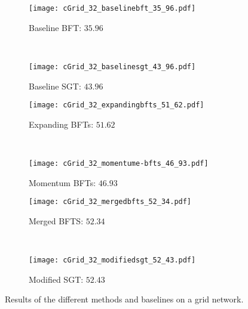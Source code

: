 \documentclass[a4paper,final,notitlepage,11pt,svgnames]{scrartcl}
\begin{document}
\begin{figure}[htpb]
	\centering
	\begin{subfigure}[b]{0.45\textwidth}
		\texttt{[image: cGrid\_32\_baselinebft\_35\_96.pdf]}
		\caption{Baseline BFT: $35.96$}
	\end{subfigure}~
	\begin{subfigure}[b]{0.45\textwidth}
		\texttt{[image: cGrid\_32\_baselinesgt\_43\_96.pdf]}
		\caption{Baseline SGT: $43.96$}
	\end{subfigure}

	\begin{subfigure}[b]{0.45\textwidth}
		\texttt{[image: cGrid\_32\_expandingbfts\_51\_62.pdf]}
		\caption{Expanding BFTs: $51.62$}
	\end{subfigure}~
	\begin{subfigure}[b]{0.45\textwidth}
		\texttt{[image: cGrid\_32\_momentume-bfts\_46\_93.pdf]}
		\caption{Momentum BFTs: $46.93$}
	\end{subfigure}

	\begin{subfigure}[b]{0.45\textwidth}
		\texttt{[image: cGrid\_32\_mergedbfts\_52\_34.pdf]}
		\caption{Merged BFTS: $52.34$}
	\end{subfigure}~
	\begin{subfigure}[b]{0.45\textwidth}
		\texttt{[image: cGrid\_32\_modifiedsgt\_52\_43.pdf]}
		\caption{Modified SGT: $52.43$}
	\end{subfigure}
	\caption{Results of the different methods and baselines on a grid network.
		\label{fig:rgrid}}
\end{figure}
\end{document}
